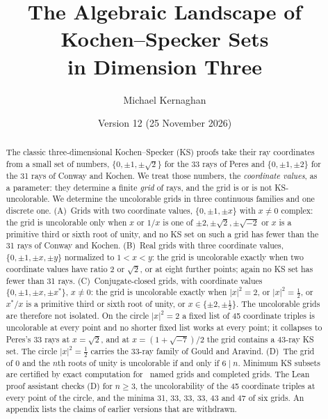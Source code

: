 \documentclass[11pt,a4paper]{article}
\title{The Algebraic Landscape of Kochen--Specker Sets\\in Dimension Three}
\author{Michael Kernaghan}
\date{Version 12 (25 November 2026)}
\theoremstyle{definition}
\theoremstyle{remark}
\begin{document}
\maketitle

\begin{abstract}
The classic three-dimensional Kochen--Specker (KS) proofs take their ray coordinates from a small
set of numbers, $\{0,\pm1,\pm\sqrt2\}$ for the 33 rays of Peres and $\{0,\pm1,\pm2\}$ for the 31
rays of Conway and Kochen.  We treat those numbers, the \emph{coordinate values}, as a parameter:
they determine a finite \emph{grid} of rays, and the grid is or is not KS-uncolorable.  We
determine the uncolorable grids in three continuous families and one discrete one.
(A)~Grids with two coordinate values, $\{0,\pm1,\pm x\}$ with $x\ne0$ complex: the grid is uncolorable only when $x$
or $1/x$ is one of $\pm2,\pm\sqrt2,\pm\sqrt{-2}$ or $x$ is a primitive third or sixth root of
unity, and no KS set on such a grid has fewer than the 31 rays of Conway
and Kochen.  (B)~Real grids with three coordinate values, $\{0,\pm1,\pm x,\pm y\}$ normalized to
$1<x<y$: the grid is uncolorable exactly when two coordinate values have ratio $2$ or $\sqrt2$,
or at eight further points; again no KS set has fewer than 31 rays.  (C)~Conjugate-closed grids,
with coordinate values $\{0,\pm1,\pm x,\pm x^{*}\}$, $x\ne0$: the grid is uncolorable exactly when $|x|^2=2$, or $|x|^2=\tfrac12$, or $x^{*}/x$ is a primitive
third or sixth root of unity, or $x\in\{\pm2,\pm\tfrac12\}$.  The uncolorable grids are
therefore not isolated.  On the circle $|x|^2=2$ a fixed list of 45 coordinate triples is uncolorable at
every point and no shorter fixed list works at every point; it collapses to Peres's 33 rays at $x=\sqrt2$, and
at $x=(1+\sqrt{-7})/2$ the grid contains a 43-ray KS set.  The circle $|x|^2=\tfrac12$ carries
the 33-ray family of Gould and Aravind.  (D)~The grid of $0$ and the $n$th roots of unity is
uncolorable if and only if $6\mid n$.  Minimum KS subsets are certified by exact computation
for \ncertified\ named grids and completed grids.  The Lean proof assistant checks (D) for $n\ge3$, the
uncolorability of the 45 coordinate triples at every point of the circle, and the minima 31, 33, 33,
33, 43 and 47 of six grids.  An appendix lists the claims of earlier versions that are withdrawn.
\end{abstract}









\end{document}
